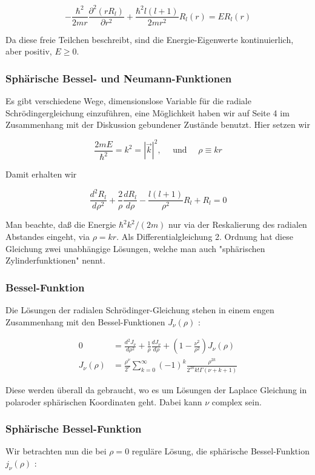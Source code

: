 \documentclass[10pt, letterpaper]{article}
\begin{document}
$$
-\frac{\hbar^{2}}{2 m r} \frac{\partial^{2}\left(r R_{l}\right)}{\partial r^{2}}+\frac{\hbar^{2} l(l+1)}{2 m r^{2}} R_{l}(r)=E R_{l}(r)
$$

Da diese freie Teilchen beschreibt, sind die Energie-Eigenwerte kontinuierlich, aber positiv, $E \geq 0$.

\subsubsection*{Sphärische Bessel- und Neumann-Funktionen}
Es gibt verschiedene Wege, dimensionslose Variable für die radiale Schrödingergleichung einzuführen, eine Möglichkeit haben wir auf Seite 4 im Zusammenhang mit der Diskussion gebundener Zustände benutzt. Hier setzen wir

$$
\frac{2 m E}{\hbar^{2}}=k^{2}=|\vec{k}|^{2}, \quad \text { und } \quad \rho \equiv k r
$$

Damit erhalten wir

$$
\frac{d^{2} R_{l}}{d \rho^{2}}+\frac{2}{\rho} \frac{d R_{l}}{d \rho}-\frac{l(l+1)}{\rho^{2}} R_{l}+R_{l}=0
$$

Man beachte, daß die Energie $\hbar^{2} k^{2} /(2 m)$ nur via der Reskalierung des radialen Abstandes eingeht, via $\rho=k r$. Als Differentialgleichung 2. Ordnung hat diese Gleichung zwei unabhängige Lösungen, welche man auch "sphärischen Zylinderfunktionen" nennt.

\subsubsection*{Bessel-Funktion}
Die Lösungen der radialen Schrödinger-Gleichung stehen in einem engen Zusammenhang mit den Bessel-Funktionen $J_{\nu}(\rho)$ :

$$
\begin{aligned}
0 & =\frac{d^{2} J_{\nu}}{d \rho^{2}}+\frac{1}{\rho} \frac{d J_{\nu}}{d \rho}+\left(1-\frac{\nu^{2}}{\rho^{2}}\right) J_{\nu}(\rho) \\
J_{\nu}(\rho) & =\frac{\rho^{\nu}}{2^{\nu}} \sum_{k=0}^{\infty}(-1)^{k} \frac{\rho^{2 k}}{2^{2 k} k!\Gamma(\nu+k+1)}
\end{aligned}
$$

Diese werden überall da gebraucht, wo es um Lösungen der Laplace Gleichung in polaroder sphärischen Koordinaten geht. Dabei kann $\nu$ complex sein.

\subsubsection*{Sphärische Bessel-Funktion}
Wir betrachten nun die bei $\rho=0$ reguläre Lösung, die sphärische Bessel-Funktion $j_{\nu}(\rho)$ :
\end{document}
